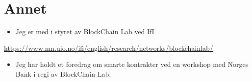 \documentclass[11pt]{article}
\begin{document}
\section{Annet}
\label{sec-7}
\begin{itemize}
\item Jeg er med i styret av BlockChain Lab ved IfI
\end{itemize}
\url{https://www.mn.uio.no/ifi/english/research/networks/blockchainlab/}


\begin{itemize}
\item Jeg  har  holdt et  foredrag om smarte kontrakter
ved en workshop med Norges Bank i regi av BlockChain Lab.
\end{itemize}
\end{document}
